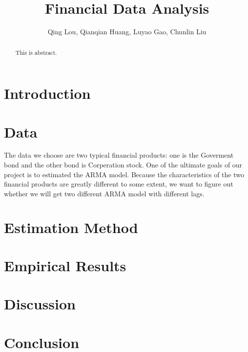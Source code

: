 \documentclass[12pt,letterpaper]{article}
\begin{document}
\title{\textbf{\Large Financial Data Analysis}}
\author{Qing Lou, Qianqian Huang, Luyao Gao, Chunlin Liu}
\date{}
\maketiitle 


\begin{abstract}
This is abstract.
\end{abstract}


\section{Introduction}

\section{Data}
         The data we choose are two typical financial products: one is the Goverment bond and the other bond is Corperation stock. One of the ultimate goals of our project is to estimated the ARMA model. Because the characteristics of the two financial products are greatly different to some extent, we want to figure out whether we will get two different ARMA model with different lags.

\section{Estimation Method}

\section{Empirical Results}

\section{Discussion}

\section{Conclusion}
\end{document}
